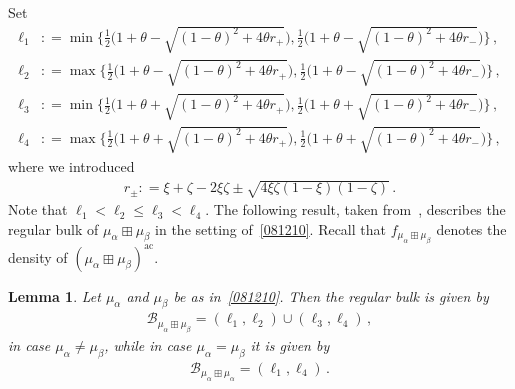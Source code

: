 \documentclass[10pt,reqno]{amsart}
\numberwithin{equation}{section}
\theoremstyle{plain}
\newtheorem{lemma}[theorem]{Lemma}
\numberwithin{kevin}{section}
\theoremstyle{remark}
\newcommand{\deq}{\mathrel{\mathop:}=}
\begin{document}
Set
\begin{align*}
\ell_{1}&\deq\min\Big\{\frac{1}{2}\Big(1+\theta-\sqrt{(1-\theta)^2+4\theta r_+}\Big), \frac{1}{2}\Big(1+\theta-\sqrt{(1-\theta)^2+4\theta r_-}\Big)\Big\}\,,\\
\ell_{2}&\deq\max\Big\{\frac{1}{2}\Big(1+\theta-\sqrt{(1-\theta)^2+4\theta r_+}\Big), \frac{1}{2}\Big(1+\theta-\sqrt{(1-\theta)^2+4\theta r_-}\Big)\Big\}\,,\\
\ell_{3}&\deq\min\Big\{\frac{1}{2}\Big(1+\theta+\sqrt{(1-\theta)^2+4\theta r_+}\Big), \frac{1}{2}\Big(1+\theta+\sqrt{(1-\theta)^2+4\theta r_-}\Big)\Big\}\,,\\
\ell_{4}&\deq\max\Big\{\frac{1}{2}\Big(1+\theta+\sqrt{(1-\theta)^2+4\theta r_+}\Big), \frac{1}{2}\Big(1+\theta+\sqrt{(1-\theta)^2+4\theta r_-}\Big)\Big\}\,,
\end{align*}
where we introduced
\begin{align}
r_{\pm}\deq\xi+\zeta-2\xi\zeta\pm\sqrt{4\xi\zeta(1-\xi)(1-\zeta)}\,. \label{r plus minus}
\end{align}
Note that $\ell_1<\ell_2\le \ell_3<\ell_4$. The following result, taken from~\cite{Kargin2012a}, describes the regular bulk of $\mu_\alpha\boxplus\mu_\beta$ in the  setting of~\eqref{081210}. Recall that $f_{\mu_\alpha\boxplus\mu_\beta}$ denotes the density of $(\mu_\alpha\boxplus\mu_\beta)^{\mathrm{ac}}$.


\begin{lemma} \label{support of two point mass} Let $\mu_\alpha$ and $\mu_\beta$ be as in~\eqref{081210}. Then the regular bulk is given by
\begin{align}
\mathcal{B}_{\mu_\alpha\boxplus\mu_\beta}=(\ell_{1}, \ell_{2})\cup (\ell_{3}, \ell_{4})\,, \label{def of I case 1}
\end{align}
in case  $\mu_\alpha\neq \mu_\beta$, while in case $\mu_\alpha=\mu_\beta$ it is given by
\begin{align}
\mathcal{B}_{\mu_\alpha\boxplus\mu_\alpha}=(\ell_{1}, \ell_{4}) \label{def of I case 2}\,.
\end{align}

 \end{lemma}
\end{document}

